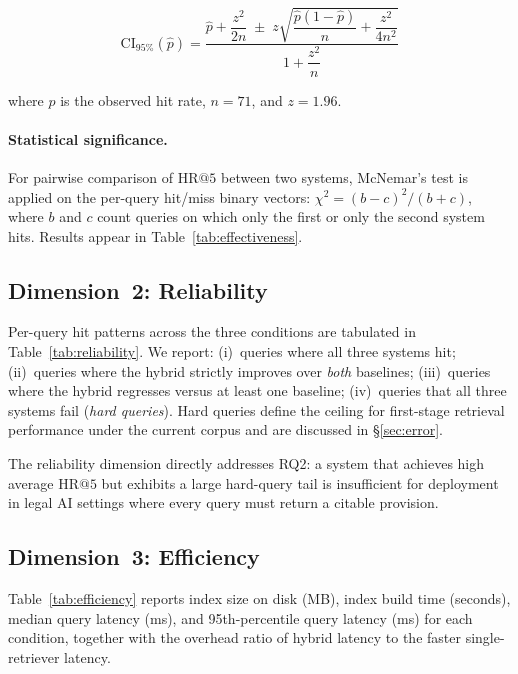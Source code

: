 \documentclass[sigconf,screen]{acmart}
\makeatletter
\newcommand{\HR}[1]{\mathrm{HR}@{#1}}
\makeatother
\begin{document}
\begin{equation}
  \label{eq:wilson}
  \mathrm{CI}_{95\%}(\hat{p}) =
    \frac{\hat{p} + \dfrac{z^2}{2n}
    \;\pm\;
    z\sqrt{\dfrac{\hat{p}(1-\hat{p})}{n} + \dfrac{z^2}{4n^2}}}
    {1 + \dfrac{z^2}{n}}
\end{equation}

\noindent where $\hat{p}$ is the observed hit rate, $n{=}71$, and
$z{=}1.96$.

\paragraph{Statistical significance.}
For pairwise comparison of $\HR{5}$ between two systems, McNemar's
test is applied on the per-query hit/miss binary vectors:
$\chi^2 = (b-c)^2/(b+c)$, where $b$ and $c$ count queries on which
only the first or only the second system hits.  Results appear in
Table~\ref{tab:effectiveness}.

\subsection{Dimension~2: Reliability}
\label{sec:eval-reliability}

Per-query hit patterns across the three conditions are tabulated in
Table~\ref{tab:reliability}.  We report: (i)~queries where all three
systems hit; (ii)~queries where the hybrid strictly improves over
\emph{both} baselines; (iii)~queries where the hybrid regresses
versus at least one baseline; (iv)~queries that all three systems
fail (\emph{hard queries}).  Hard queries define the ceiling for
first-stage retrieval performance under the current corpus and are
discussed in \S\ref{sec:error}.

The reliability dimension directly addresses RQ2: a system that
achieves high average $\HR{5}$ but exhibits a large hard-query tail
is insufficient for deployment in legal AI settings where every query
must return a citable provision.

\subsection{Dimension~3: Efficiency}
\label{sec:eval-efficiency}

Table~\ref{tab:efficiency} reports index size on disk (MB), index
build time (seconds), median query latency (ms), and 95th-percentile
query latency (ms) for each condition, together with the overhead
ratio of hybrid latency to the faster single-retriever latency.
\end{document}
